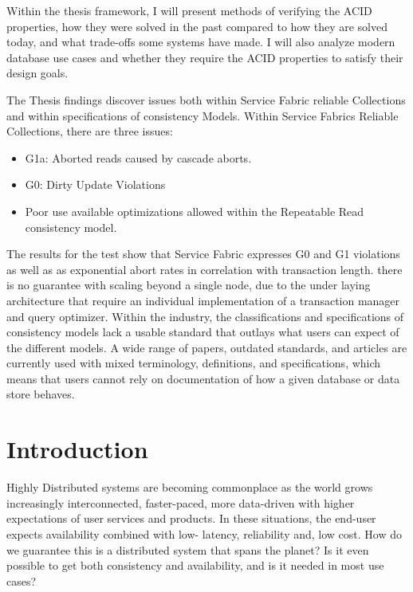 \documentclass[a4paper,10pt,titlepage]{report}
\begin{document}
    Within the thesis framework, I will present methods of verifying the ACID properties, how they were solved in the past compared to how they are solved today, and what trade-offs some systems have made. I will also analyze modern database use cases and whether they require the ACID properties to satisfy their design goals.\\
    \vspace{5mm}


    The Thesis findings discover issues both within Service Fabric reliable Collections and within specifications of consistency Models. 
    Within Service Fabrics Reliable Collections, there are three issues: 
    \begin{itemize}
    \item G1a: Aborted reads caused by cascade aborts.
    \item G0: Dirty Update Violations
    \item Poor use available optimizations allowed within the Repeatable Read consistency model. 
    \end{itemize}
    
    The results for the test show that Service Fabric expresses G0 and G1 violations as well as as exponential abort rates in correlation with transaction length. there is no guarantee with scaling beyond a single node, due to the under laying architecture that require an individual implementation of a transaction manager and query optimizer.
    Within the industry, the classifications and specifications of consistency models lack a usable standard that outlays what users can expect of the different models.
    A wide range of papers, outdated standards, and articles are currently used with mixed terminology, definitions, and specifications, which means that users cannot rely on documentation of how a given database or data store behaves.




    \chapter{Introduction}
    Highly Distributed systems are becoming commonplace as the world grows increasingly interconnected, faster-paced, more data-driven with higher expectations of user services and products. In these situations, the end-user expects availability combined with low- latency, reliability and, low cost. How do we guarantee this is a distributed system that spans the planet? Is it even possible to get both consistency and availability, and is it needed in most use cases?\\
    \vspace{5mm}
\end{document}

